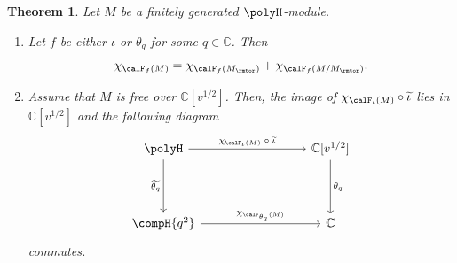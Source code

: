 \documentclass[12pt, reqno]{amsart}
\theoremstyle{plain}
\newtheorem{theorem}{Theorem}[section]
\theoremstyle{definition}
\numberwithin{equation}{section}
\numberwithin{figure}{section}
\numberwithin{table}{section}
\def\C{\mathbb C}
\begin{document}
\begin{theorem}\label{thm: character and specialization}
Let $M$ be a finitely generated $\polyH$-module.
\begin{enumerate}[label = {\rm (\arabic*)}]
\item 
Let $f$ be either $\iota$ or $\theta_q$ for some $q \in \C$.
Then
\[
\chi_{\calF_{f}(M)} = \chi_{\calF_{f}(M_{\rmtor})} + \chi_{\calF_{f}(M/M_{\rmtor})}.
\]


\item
Assume that $M$ is free over $\C[v^{1/2}]$.
Then, the image of $\chi_{\calF_{\iota}(M)} \circ \widetilde{\iota}$ lies in $\C[v^{1/2}]$ and 
the following diagram
\[
\begin{tikzcd}[column sep=3cm, row sep=1.5cm]
{\polyH} \arrow[d, "\widetilde{\theta_q}"'] \arrow[r, "{\chi_{\calF_\iota(M)} \; \circ \;\widetilde{\iota}}"] & {\C[v^{1/2}]} \arrow[d, "\theta_q"] \\
\compH{q^2} \arrow[r, "\chi_{\calF_{\theta_q}(M)}"] & \C 
\end{tikzcd}
\]
 commutes.
\end{enumerate}
\end{theorem}
\end{document}
